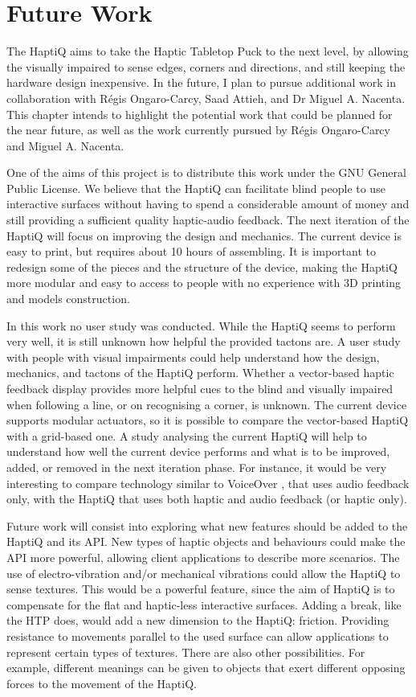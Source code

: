 \chapter{Future Work}
\label{chap:futureWork}

The HaptiQ aims to take the Haptic Tabletop Puck to the next level, by allowing the visually impaired to sense edges, corners and directions, and still keeping the hardware design inexpensive. In the future, I plan to pursue additional work in collaboration with Régis Ongaro-Carcy, Saad Attieh, and Dr Miguel A. Nacenta. This chapter intends to highlight the potential work that could be planned for the near future, as well as the work currently pursued by Régis Ongaro-Carcy and Miguel A. Nacenta. 

One of the aims of this project is to distribute this work under the GNU General Public License. We believe that the HaptiQ can facilitate blind people to use interactive surfaces without having to spend a considerable amount of money and still providing a sufficient quality haptic-audio feedback. 
The next iteration of the HaptiQ will focus on improving the design and mechanics. The current device is easy to print, but requires about 10 hours of assembling. It is important to redesign some of the pieces and the structure of the device, making the HaptiQ more modular and easy to access to people with no experience with 3D printing and models construction. 

In this work no user study was conducted. While the HaptiQ seems to perform very well, it is still unknown how helpful the provided tactons are. A user study with people with visual impairments could help understand how the design, mechanics, and tactons of the HaptiQ perform. Whether a vector-based haptic feedback display provides more helpful cues to the blind and visually impaired when following a line, or on recognising a corner, is unknown. The current device supports modular actuators, so it is possible to compare the vector-based HaptiQ with a grid-based one. A study analysing the current HaptiQ will help to understand how well the current device performs and what is to be improved, added, or removed in the next iteration phase. For instance, it would be very interesting to compare technology similar to VoiceOver \cite{voiceOver}, that uses audio feedback only, with the HaptiQ that uses both haptic and audio feedback (or haptic only).  

Future work will consist into exploring what new features should be added to the HaptiQ and its API. New types of haptic objects and behaviours could make the API more powerful, allowing client applications to describe more scenarios. The use of electro-vibration and/or mechanical vibrations could allow the HaptiQ to sense textures. This would be a powerful feature, since the aim of HaptiQ is to compensate for the flat and haptic-less interactive surfaces. Adding a break, like the HTP \cite{marquardt2009haptic} does, would add a new dimension to the HaptiQ: friction. Providing resistance to movements parallel to the used surface can allow applications to represent certain types of textures. There are also other possibilities. For example, different meanings can be given to objects that exert different opposing forces to the movement of the HaptiQ. 

